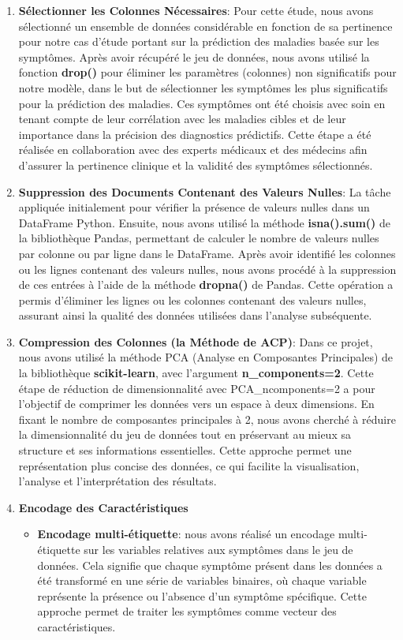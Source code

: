 \begin{enumerate}
    \item \textbf{Sélectionner les Colonnes Nécessaires}: Pour cette étude, nous avons sélectionné un ensemble de données considérable en fonction de sa pertinence pour notre cas d'étude portant sur la prédiction des maladies basée sur les symptômes. Après avoir récupéré le jeu de données, nous avons utilisé la fonction \textbf{drop()} pour éliminer les paramètres (colonnes) non significatifs pour notre modèle, dans le but de sélectionner les symptômes les plus significatifs pour la prédiction des maladies. Ces symptômes ont été choisis avec soin en tenant compte de leur corrélation avec les maladies cibles et de leur importance dans la précision des diagnostics prédictifs. Cette étape a été réalisée en collaboration avec des experts médicaux et des médecins afin d'assurer la pertinence clinique et la validité des symptômes sélectionnés.
    \item \textbf{Suppression des Documents Contenant des Valeurs Nulles}: La tâche appliquée initialement pour vérifier la présence de valeurs nulles dans un DataFrame Python. Ensuite, nous avons utilisé la méthode \textbf{isna().sum()} de la bibliothèque Pandas, permettant de calculer le nombre de valeurs nulles par colonne ou par ligne dans le DataFrame. Après avoir identifié les colonnes ou les lignes contenant des valeurs nulles, nous avons procédé à la suppression de ces entrées à l'aide de la méthode \textbf{dropna()} de Pandas. Cette opération a permis d'éliminer les lignes ou les colonnes contenant des valeurs nulles, assurant ainsi la qualité des données utilisées dans l'analyse subséquente.
    \item \textbf{Compression des Colonnes (la Méthode de ACP)}: Dans ce projet, nous avons utilisé la méthode PCA (Analyse en Composantes Principales) de la bibliothèque \textbf{scikit-learn}, avec l'argument \textbf{n\_components=2}. Cette étape de réduction de dimensionnalité avec PCA\_ncomponents=2 a pour l’objectif de comprimer les données vers un espace à deux dimensions. En fixant le nombre de composantes principales à 2, nous avons cherché à réduire la dimensionnalité du jeu de données tout en préservant au mieux sa structure et ses informations essentielles. Cette approche permet une représentation plus concise des données, ce qui facilite la visualisation, l'analyse et l'interprétation des résultats.
    \item \textbf{Encodage des Caractéristiques} \begin{itemize}
        \item \textbf{Encodage multi-étiquette}: nous avons réalisé un encodage multi-étiquette sur les variables relatives aux symptômes dans le jeu de données. Cela signifie que chaque symptôme présent dans les données a été transformé en une série de variables binaires, où chaque variable représente la présence ou l'absence d'un symptôme spécifique. Cette approche permet de traiter les symptômes comme vecteur des caractéristiques.

\end{itemize}
\end{enumerate}
